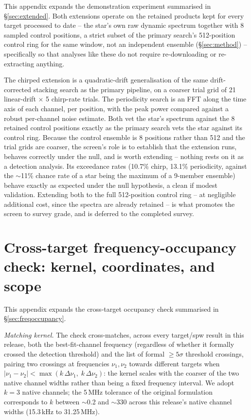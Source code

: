 \documentclass{openjournal}
\begin{document}
This appendix expands the demonstration experiment summarised in
\S\ref{sec:extended}. Both extensions operate on the retained products
kept for every target processed to date -- the star's own raw dynamic
spectrum together with 8 sampled control positions, a strict subset of
the primary search's 512-position control ring for the same window,
not an independent ensemble (\S\ref{sec:method}) -- specifically so
that analyses like these do not require re-downloading or
re-extracting anything.

The chirped extension is a quadratic-drift generalisation of the same
drift-corrected stacking search as the primary pipeline, on a coarser
trial grid of 21 linear-drift $\times$ 5 chirp-rate trials. The
periodicity search is an FFT along the time axis of each channel, per
position, with the peak power compared against a robust per-channel
noise estimate. Both vet the star's spectrum against the 8 retained
control positions exactly as the primary search vets the star against
its control ring. Because the control ensemble is 8 positions rather
than 512 and the trial grids are coarser, the screen's role is to
establish that the extension runs, behaves correctly under the null,
and is worth extending -- nothing rests on it as a detection analysis.
Its exceedance rates (10.7\% chirp, 13.1\% periodicity, against the
$\sim$11\% chance rate of a star being the maximum of a 9-member
ensemble) behave exactly as expected under the null hypothesis, a
clean if modest validation. Extending both to the full 512-position
control ring -- at negligible additional cost, since the spectra are
already retained -- is what promotes the screen to survey grade, and
is deferred to the completed survey.

\section{Cross-target frequency-occupancy check: kernel, coordinates,
and scope}
\label{app:freqoccupancy}

This appendix expands the cross-target occupancy check summarised in
\S\ref{sec:freqoccupancy}.

\emph{Matching kernel.} The check cross-matches, across every
target/spw result in this release, both the best-fit-channel frequency
(regardless of whether it formally crossed the detection threshold)
and the list of formal $\geq5\sigma$ threshold crossings, pairing two
crossings at
frequencies $\nu_1, \nu_2$ towards different targets when
$|\nu_1-\nu_2| < \max(k\,\Delta\nu_1,\; k\,\Delta\nu_2)$: the kernel
scales with the coarser of the two native channel widths rather than
being a fixed frequency interval. We adopt $k=3$ native channels; the
5\,MHz tolerance of the original formulation corresponds to $k$
between $\sim$0.2 and $\sim$330 across this release's native channel
widths (15.3\,kHz to 31.25\,MHz).
\end{document}
